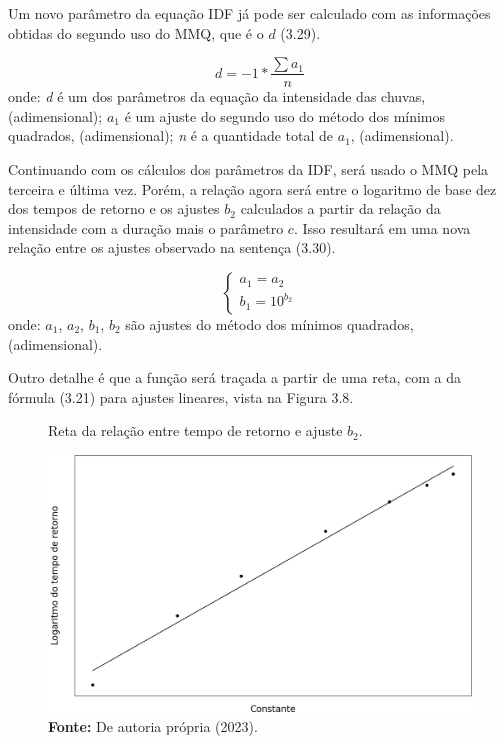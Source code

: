 \newpage

Um novo parâmetro da equação IDF já pode ser calculado com as informações obtidas do segundo uso do MMQ, que é o $d$ (3.29). 

\begin{equation}
d = -1 * \frac{\sum{a_1}}{n}
\end{equation}
\newline
onde:
\newline
\textit{d} é um dos parâmetros da equação da intensidade das chuvas, (adimensional);
\newline
$a_1$ é um ajuste do segundo uso do método dos mínimos quadrados, (adimensional);
\newline
\textit{n} é a quantidade total de $a_1$, (adimensional).\bigskip

Continuando com os cálculos dos parâmetros da IDF, será usado o MMQ pela terceira e última vez. Porém, a relação agora será entre o logaritmo de base dez dos tempos de retorno e os ajustes $b_2$ calculados a partir da relação da intensidade com a duração mais o parâmetro $c$. Isso resultará em uma nova relação entre os ajustes observado na sentença (3.30).\bigskip

\begin{equation}
\begin{cases}
a_1 = a_2 \\
b_1 = 10^{b_2}
\end{cases}
\end{equation}
\newline
onde:
\newline
$a_1$, $a_2$, $b_1$, $b_2$ são ajustes do método dos mínimos quadrados, (adimensional).\bigskip

Outro detalhe é que a função será traçada a partir de uma reta, com a da fórmula (3.21) para ajustes lineares, vista na Figura 3.8.\bigskip

\begin{figure}[!ht]
	\centering
	\caption{Reta da relação entre tempo de retorno e ajuste $b_2$.}
	\includegraphics[width=.7325\linewidth]{figuras/reta_de_tempo_de_retorno.png}
	\caption*{\textbf{Fonte:} De autoria própria (2023).}
	\label{fig:reta_de_tempo_de_retorno.png}
\end{figure}

